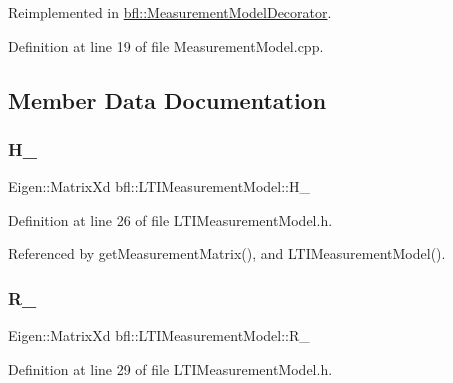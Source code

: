 Reimplemented in \mbox{\hyperlink{classbfl_1_1MeasurementModelDecorator_a531a891152d7bf83e56370664d54f42f}{bfl\+::\+Measurement\+Model\+Decorator}}.



Definition at line 19 of file Measurement\+Model.\+cpp.



\subsection{Member Data Documentation}
\mbox{\label{classbfl_1_1LTIMeasurementModel_a80d80b217b891b07294f1c854ccc65fd}} 
\subsubsection{\texorpdfstring{H\+\_\+}{H\_}}
{\footnotesize\ttfamily Eigen\+::\+Matrix\+Xd bfl\+::\+L\+T\+I\+Measurement\+Model\+::\+H\+\_\+\hspace{0.3cm}{\ttfamily [protected]}}



Definition at line 26 of file L\+T\+I\+Measurement\+Model.\+h.



Referenced by get\+Measurement\+Matrix(), and L\+T\+I\+Measurement\+Model().

\mbox{\label{classbfl_1_1LTIMeasurementModel_a9939b62a6395e15873d43a445e6f8938}} 
\subsubsection{\texorpdfstring{R\+\_\+}{R\_}}
{\footnotesize\ttfamily Eigen\+::\+Matrix\+Xd bfl\+::\+L\+T\+I\+Measurement\+Model\+::\+R\+\_\+\hspace{0.3cm}{\ttfamily [protected]}}



Definition at line 29 of file L\+T\+I\+Measurement\+Model.\+h.



